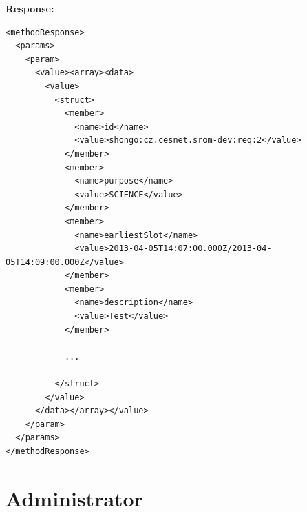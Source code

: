 \noindent\textbf{Response:}

{\scriptsize\begin{verbatim}
<methodResponse>
  <params>
    <param>
      <value><array><data>
        <value>
          <struct>
            <member>
              <name>id</name>
              <value>shongo:cz.cesnet.srom-dev:req:2</value>
            </member>
            <member>
              <name>purpose</name>
              <value>SCIENCE</value>
            </member>
            <member>
              <name>earliestSlot</name>
              <value>2013-04-05T14:07:00.000Z/2013-04-05T14:09:00.000Z</value>
            </member>
            <member>
              <name>description</name>
              <value>Test</value>
            </member>

            ...
            
          </struct>
        </value>            
      </data></array></value>
    </param>
  </params>
</methodResponse>
\end{verbatim}}

\section{Administrator}

\nocite{*}




